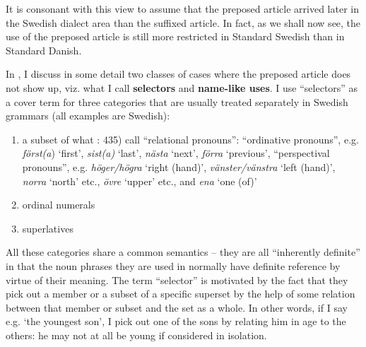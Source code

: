 It is consonant with this view to assume that the preposed article arrived later in the Swedish dialect area than the suffixed article. In fact, as we shall now see, the use of the preposed article is still more restricted in Standard Swedish than in Standard Danish. 


In \citet{Dahl2003}, I discuss in some detail two classes of cases where the preposed article does not show up, viz. what I call \textbf{selectors} and \textbf{name-like uses}. I use “selectors” as a cover term for three categories that are usually treated separately in Swedish grammars (all examples are Swedish):


\begin{enumerate}
\item a subset of what \citet{TelemanEtAl1999}: 435) call “relational pronouns”: “ordinative pronouns”, e.g. \textit{först(a}) ‘first’, \textit{sist(a)} ‘last’, \textit{nästa} ‘next’, \textit{förra }‘previous’, “perspectival pronouns”, e.g. \textit{höger/högra }‘right (hand)’, \textit{vänster/vänstra} ‘left (hand)’, \textit{norra} ‘north’ etc., \textit{övre} ‘upper’ etc., and \textit{ena} ‘one (of)’ 


\item ordinal numerals


\item superlatives




\end{enumerate}

All these categories share a common semantics – they are all “inherently definite” in that the noun phrases they are used in normally have definite reference by virtue of their meaning. The term “selector” is motivated by the fact that they pick out a member or a subset of a specific superset by the help of some relation between that member or subset and the set as a whole. In other words, if I say e.g.  ‘the youngest son’, I pick out one of the sons by relating him in age to the others: he may not at all be young if considered in isolation. 

